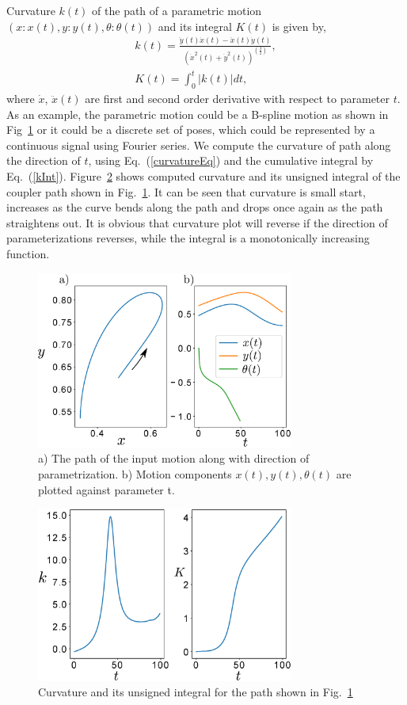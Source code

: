 \documentclass[twocolumn,10pt]{asme2ej}
\newcommand{\req}[1]{(\ref{#1})}
\begin{document}
Curvature $k(t)$ of the path of a parametric motion $(x:x(t), y:y(t), \theta:\theta(t))$ and its integral $K(t)$ is given by,
\begin{eqnarray}
  k(t) = \frac{\ddot{y}(t)\dot{x}(t) - \ddot{x}(t)\dot{y}(t)}{{(\dot{x}^2(t) + \dot{y}^2(t))}^{(\frac 32)}}, \label{curvatureEq}\\
  K(t) = \int^{t}_0 |k(t)|dt \label{kInt},
\end{eqnarray}
where $\dot{x}$, $\ddot{x}(t)$ are first and second order derivative with respect to parameter $t$.
As an example, the parametric motion could be a B-spline motion as shown in Fig~\ref{bsplineFitting} or it could be a discrete set of poses, which could be represented by a continuous signal using Fourier series.
We compute the curvature of path along the direction of $t$, using Eq.~\req{curvatureEq} and the cumulative integral by Eq.~\req{kInt}.
Figure~\ref{curvatureK} shows computed curvature and its unsigned integral of the coupler path shown in Fig.~\ref{bsplineFitting}.
It can be seen that curvature is small start, increases as the curve bends along the path and drops once again as the path straightens out. It is obvious that curvature plot will reverse if the direction of parameterizations reverses, while the integral is a monotonically increasing function.

\begin{figure}
\centering
\includegraphics[width=240pt]{figure/fig_bspline.eps}
  \caption{a) The path of the input motion along with direction of parametrization. b) Motion components $x(t), y(t), \theta(t)$ are plotted against parameter t.}
\label{bsplineFitting}
\end{figure}

\begin{figure}
\centering
\includegraphics[width=240pt]{figure/fig_curvatureK.eps}
  \caption{Curvature and its unsigned integral for the path shown in Fig.~\ref{bsplineFitting}}
\label{curvatureK}
\end{figure}
\end{document}
